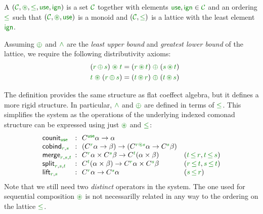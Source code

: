 \begin{definition}
A \emph{} $(\C, \cseq, \cleq, \cunit, \czero)$ is a set 
$\C$ together with elements $\cunit, \czero \in \C$ and an ordering $\cleq$ such 
that $(\C, \cseq, \cunit)$ is a monoid and $(\C, \cleq)$ is a lattice with the least 
element $\czero$. 

Assuming $\cpar$ and $\czip$ are the \emph{least upper bound} and \emph{greatest lower bound}
of the lattice, we require the following distributivity axioms:
%
\begin{align*}
\quad (\cclrd{r}\, \cpar\, \cclrd{s}) \;\cseq\; \cclrd{t} & = (\cclrd{r} \,\cseq\, \cclrd{t}) \;\cpar\; (\cclrd{s}\, \cseq\, \cclrd{t}) \\
\quad \cclrd{t} \;\cseq\; (\cclrd{r}\, \cpar\, \cclrd{s}) & = (\cclrd{t} \,\cseq\, \cclrd{r}) \;\cpar\; (\cclrd{t}\, \cseq\, \cclrd{s})
\end{align*}
\end{definition}

\noindent
The definition provides the same structure as flat coeffect algebra, but it defines a more rigid 
structure. In particular, $\czip$ and $\cpar$ are defined in terms of $\cleq$. This simplifies the 
system as the operations of the underlying indexed comonad structure can be expressed using just
$\cseq$ and $\cleq$:
%
\begin{equation*}
\begin{array}{lcll}
 \ident{counit}_{\cunit} &\narrow{:}& 
    \ctyp{\cunit}{\alpha} \rightarrow \alpha \\
 \ident{cobind}_{\cclrd{r}, \cclrd{s}} &\narrow{:}& 
    (\ctyp{\cclrd{r}}{\alpha} \rightarrow \beta) \rightarrow (\ctyp{\cclrd{r}\cseq\cclrd{s}}{\alpha} \rightarrow \ctyp{\cclrd{s}}{\beta}) \\
\ident{merge}_{\cclrd{r},\cclrd{s},\cclrd{t}} &\narrow{:}& 
    \ctyp{\cclrd{r}}{\alpha} \times \ctyp{\cclrd{s}}{\beta} \rightarrow \ctyp{\cclrd{t}}{(\alpha \times \beta)} &
    (\cclrd{t}\,\cleq\,\cclrd{r}, \cclrd{t}\,\cleq\,\cclrd{s}) \\
\ident{split}_{\cclrd{r},\cclrd{s},\cclrd{t}} &\narrow{:}& 
    \ctyp{\cclrd{t}}{(\alpha \times \beta)} \rightarrow \ctyp{\cclrd{r}}{\alpha} \times \ctyp{\cclrd{s}}{\beta} &
    (\cclrd{r}\,\cleq\,\cclrd{t}, \cclrd{s}\,\cleq\,\cclrd{t}) \\
\ident{lift}_{\cclrd{r},\cclrd{s}} &\narrow{:}& 
    \ctyp{\cclrd{r}}{\alpha} \rightarrow \ctyp{\cclrd{s}}{\alpha} & 
    (\cclrd{s}\,\cleq\,\cclrd{r})
\end{array}
\end{equation*}
%
Note that we still need two \emph{distinct} operators in the system. The one used for
sequential composition $\cseq$ is not necessarilly related in any way to the ordering on
the lattice $\cleq$. 

